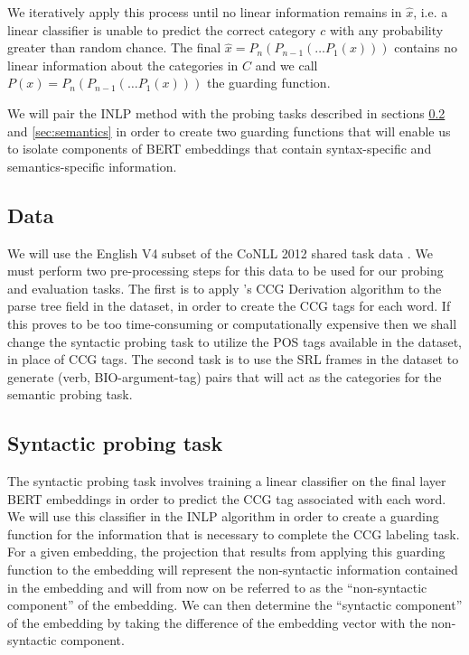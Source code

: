 \documentclass[11pt,a4paper]{article}
\begin{document}
We iteratively apply this process until no linear information remains in $\hat{x}$, i.e. a linear classifier is unable to predict the correct category $c$ with any probability greater than random chance. The final $\hat{x} = P_n(P_{n-1}(\dots P_1(x)))$ contains no linear information about the categories in $C$ and we call $P(x) = P_n(P_{n-1}(\dots P_1(x)))$ the guarding function. 

We will pair the INLP method with the probing tasks described in sections \ref{sec:syntactic} and \ref{sec:semantics} in order to create two guarding functions that will enable us to isolate components of BERT embeddings that contain syntax-specific and semantics-specific information. 

\subsection{Data}
\label{sec:data}

We will use the English V4 subset of the CoNLL 2012 shared task data \citep{2012-conll} . We must perform two pre-processing steps for this data to be used for our probing and evaluation tasks. The first is to apply \citet{ccg-bank}'s CCG Derivation algorithm to the parse tree field in the dataset, in order to create the CCG tags for each word. If this proves to be too time-consuming or computationally expensive then we shall change the syntactic probing task to utilize the POS tags available in the dataset, in place of CCG tags. The second task is to use the SRL frames in the dataset to generate (verb, BIO-argument-tag) pairs that will act as the categories for the semantic probing task. 

\subsection{Syntactic probing task}
\label{sec:syntactic}

The syntactic probing task involves training a linear classifier on the final layer BERT embeddings in order to predict the CCG tag associated with each word. We will use this classifier in the INLP algorithm in order to create a guarding function for the information that is necessary to complete the CCG labeling task. For a given embedding, the projection that results from applying this guarding function to the embedding will represent the non-syntactic information contained in the embedding and will from now on be referred to as the ``non-syntactic component'' of the embedding. We can then determine the ``syntactic component'' of the embedding by taking the difference of the embedding vector with the non-syntactic component. 
\end{document}
